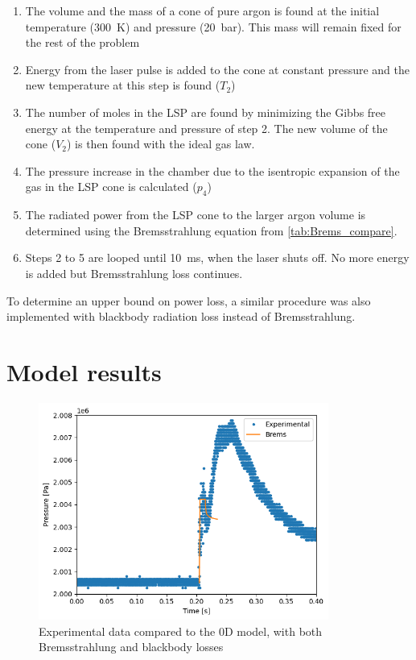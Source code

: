         \begin{enumerate}
            \item The volume and the mass of a cone of pure argon is found at the initial temperature (\qty{300}{K}) and pressure (\qty{20}{bar}). This mass will remain fixed for the rest of the problem
            \item Energy from the laser pulse is added to the cone at constant pressure and the new temperature at this step is found ($T_2$)
            \item The number of moles in the LSP are found by minimizing the Gibbs free energy at the temperature and pressure of step 2. The new volume of the cone ($V_2$) is then found with the ideal gas law.
            \item The pressure increase in the chamber due to the isentropic expansion of the gas in the LSP cone is calculated ($p_4$)
            \item The radiated power from the LSP cone to the larger argon volume is determined using the Bremsstrahlung equation from \autoref{tab:Brems_compare}.
            \item Steps 2 to 5 are looped until \qty{10}{ms}, when the laser shuts off. No more energy is added but Bremsstrahlung loss continues.
        \end{enumerate}
        
        To determine an upper bound on power loss, a similar procedure was also implemented with blackbody radiation loss instead of Bremsstrahlung.

    \section{Model results}

        \begin{figure}[!ht]
            \centering
            \includegraphics[width=0.85\textwidth]{assets/2 models/Brems vs exp graph.png}
            \caption{Experimental data compared to the 0D model, with both Bremsstrahlung and blackbody losses}
            \label{fig:Model results}
        \end{figure}

